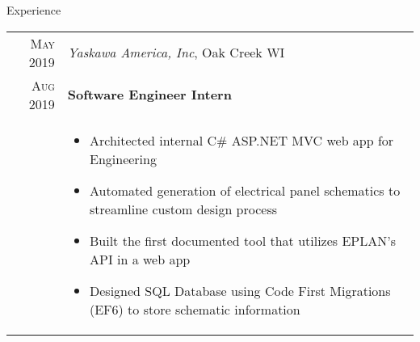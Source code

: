 \documentclass{resume}
\begin{document}
\begin{rSection}{Experience}
{  \begin{tabular}{r|p{16cm}}
    \textsc{May 2019} & \textit{Yaskawa America, Inc}, Oak Creek WI \\
    \textsc{Aug 2019}  & \textbf{Software Engineer Intern} \\ &
    \begin{itemize}
        \item {Architected internal C\# ASP.NET MVC web app for Engineering}
        \item {Automated generation of electrical panel schematics to streamline custom design process}
        \item {Built the first documented tool that utilizes EPLAN's API in a web app}
        \item {Designed SQL Database using Code First Migrations (EF6) to store schematic information}
    \end{itemize}
  \end{tabular}


  
}
\end{rSection}
\end{document}
